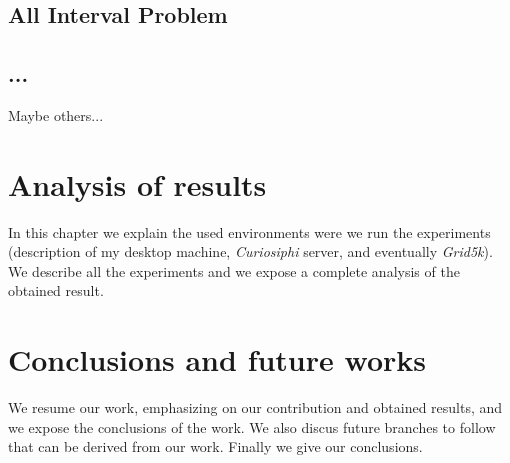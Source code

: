 \documentclass[a4paper]{book} %
\begin{document}

\section{All Interval Problem}


\section{...}

Maybe others...

\chapter{Analysis of results}

In this chapter we explain the used environments were we run the experiments (description of my desktop machine, \textit{Curiosiphi} server, and eventually \textit{Grid5k}). We describe all the experiments and we expose a complete analysis of the obtained result.

\chapter{Conclusions and future works}

We resume our work, emphasizing on our contribution and obtained results, and we expose the conclusions of the work. We also discus future branches to follow that can be derived from our work. Finally we give our conclusions. 
\end{document}
